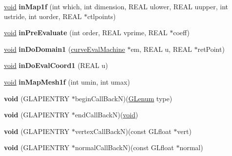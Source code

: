 \begin{DoxyCompactItemize}
\hyperlink{interfacevoid}{void} {\bfseries in\+Map1f} (int which, int dimension, R\+E\+AL ulower, R\+E\+AL uupper, int ustride, int uorder, R\+E\+AL $\ast$ctlpoints)
\item 
\mbox{\label{class_open_g_l_curve_evaluator_af3792e85fcf78bbbec8f5c710560204c}} 
\hyperlink{interfacevoid}{void} {\bfseries in\+Pre\+Evaluate} (int order, R\+E\+AL vprime, R\+E\+AL $\ast$coeff)
\item 
\mbox{\label{class_open_g_l_curve_evaluator_a0ea187ee794cc5993716b3a2ffed6788}} 
\hyperlink{interfacevoid}{void} {\bfseries in\+Do\+Domain1} (\hyperlink{structcurve_eval_machine}{curve\+Eval\+Machine} $\ast$em, R\+E\+AL u, R\+E\+AL $\ast$ret\+Point)
\item 
\mbox{\label{class_open_g_l_curve_evaluator_af149cd797281a9366ba5e5348f2680f5}} 
\hyperlink{interfacevoid}{void} {\bfseries in\+Do\+Eval\+Coord1} (R\+E\+AL u)
\item 
\mbox{\label{class_open_g_l_curve_evaluator_af1539ce325b041e883cd577c8db66795}} 
\hyperlink{interfacevoid}{void} {\bfseries in\+Map\+Mesh1f} (int umin, int umax)
\item 
\mbox{\label{class_open_g_l_curve_evaluator_ad64a97287c191d9ee588ffb47e106764}} 
{\bfseries void} (G\+L\+A\+P\+I\+E\+N\+T\+RY $\ast$begin\+Call\+BackN)(\hyperlink{interfacevoid}{G\+Lenum} type)
\item 
\mbox{\label{class_open_g_l_curve_evaluator_ad25650edb3a8453421d46faf4a57f883}} 
{\bfseries void} (G\+L\+A\+P\+I\+E\+N\+T\+RY $\ast$end\+Call\+BackN)(\hyperlink{interfacevoid}{void})
\item 
\mbox{\label{class_open_g_l_curve_evaluator_ab52b3e82d3ab5a0dc7f942e6864d0892}} 
{\bfseries void} (G\+L\+A\+P\+I\+E\+N\+T\+RY $\ast$vertex\+Call\+BackN)(const G\+Lfloat $\ast$vert)
\item 
\mbox{\label{class_open_g_l_curve_evaluator_aee5284ea3948f4b6af064e429d9dcd2b}} 
{\bfseries void} (G\+L\+A\+P\+I\+E\+N\+T\+RY $\ast$normal\+Call\+BackN)(const G\+Lfloat $\ast$normal)

\end{DoxyCompactItemize}
